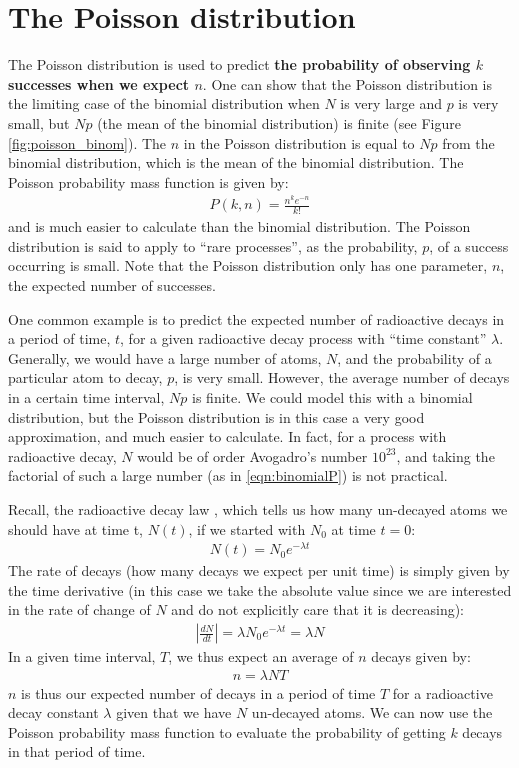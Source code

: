 \section{The Poisson distribution}
The Poisson distribution is used to predict \textbf{the probability of observing $k$ successes when we expect $n$}. One can show that the Poisson distribution is the limiting case of the binomial distribution when $N$ is very large and $p$ is very small, but $Np$ (the mean of the binomial distribution) is finite (see Figure \ref{fig:poisson_binom}). The $n$ in the Poisson distribution is equal to $Np$ from the binomial distribution, which is the mean of the binomial distribution. The Poisson probability mass function is given by:
\begin{align*}
 P(k,n)=\frac{n^k e^{-n}}{k!} 
\end{align*}  
and is much easier to calculate than the binomial distribution. The Poisson distribution is said to apply to ``rare processes'', as the probability, $p$, of a success occurring is small. Note that the Poisson distribution only has one parameter, $n$, the expected number of successes. 

One common example is to predict the expected number of radioactive decays in a period of time, $t$, for a given radioactive decay process with ``time constant'' $\lambda$. Generally, we would have a large number of atoms, $N$, and the probability of a particular atom to decay, $p$, is very small. However, the average number of decays in a certain time interval, $Np$ is finite. We could model this with a binomial distribution, but the Poisson distribution is in this case a very good approximation, and much easier to calculate. In fact, for a process with radioactive decay, $N$ would be of order Avogadro's number $10^{23}$, and taking the factorial of such a large number (as in \ref{eqn:binomialP}) is not practical.

Recall, the radioactive decay law , which tells us how many un-decayed atoms we should have at time t, $N(t)$, if we started with $N_0$ at time $t=0$:
\begin{align}
N(t)=N_0e^{-\lambda t}
\end{align}
The rate of decays (how many decays we expect per unit time) is simply given by the time derivative (in this case we take the absolute value since we are interested in the rate of change of $N$ and do not explicitly care that it is decreasing):
\begin{align}
\left | \frac{dN}{dt} \right |=\lambda N_0e^{-\lambda t}=\lambda N
\end{align}
In a given time interval, $T$, we thus expect an average of $n$ decays given by:
\begin{align}
n=\lambda N T
\end{align}
$n$ is thus our expected number of decays in a period of time $T$ for a radioactive decay constant $\lambda$ given that we have $N$ un-decayed atoms. We can now use the Poisson probability mass function to evaluate the probability of getting $k$ decays in that period of time. 


